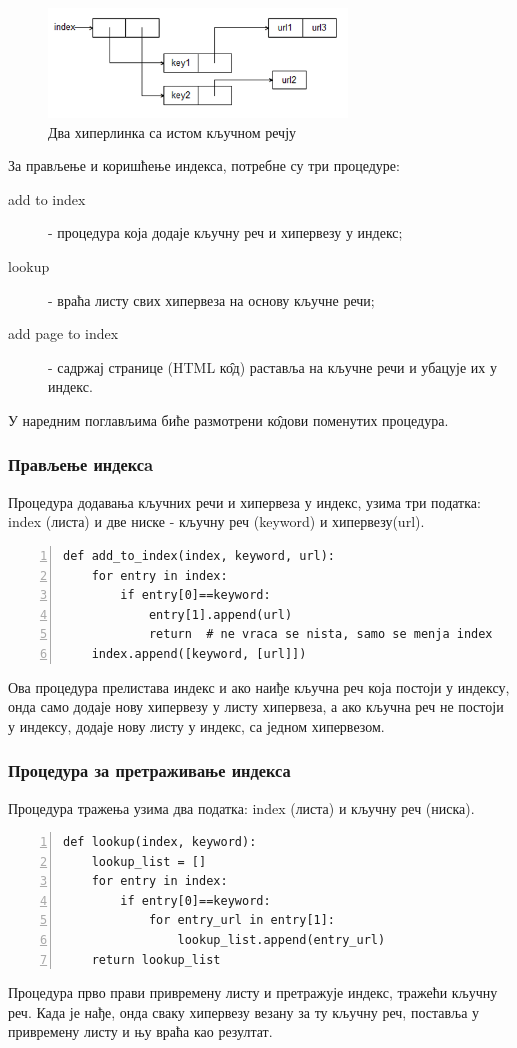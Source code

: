 \documentclass[11pt, serbianc, english, titlepage]{article}
\begin{document}
		\begin{figure}[here]
		\centering
		
		\includegraphics[height=110px, width=300px]{index3.png}
		\caption{Два хиперлинка са истом кључном речју}
		\label{slike:index3}
		\end{figure}	  
	    За прављење и коришћење индекса, потребне су три процедуре:
	    \begin{description}
	    \item[add to index] - процедура која додаје кључну реч и хипервезу у индекс;
	    \item[lookup] - враћа листу свих хипервеза на основу кључне речи;
	    \item[add page to index] - садржај странице (HTML к\^{о}д) раставља на кључне речи и убацује их у индекс.
	    \end{description}
	    У наредним поглављима биће размотрени к\^{о}дови поменутих процедура.
		\subsubsection{Прављење индексa}
		Процедура додавања кључних речи и хипервеза у индекс, узима три податка: index (листа) и две ниске - кључну реч (keyword) и хипервезу(url).
		\begin{lstlisting}[caption=Процедура add\_to\_index, label={lst:addtoindex}, numbers=left]
def add_to_index(index, keyword, url):
    for entry in index:
        if entry[0]==keyword:
            entry[1].append(url)
            return  # ne vraca se nista, samo se menja index
    index.append([keyword, [url]])
		\end{lstlisting}
		Ова процедура прелистава индекс и ако наиђе кључна реч која постоји у индексу, онда само додаје нову хипервезу у листу хипервеза, а ако кључна реч не постоји у индексу, додаје нову листу у индекс, са једном хипервезом.
		\subsubsection{Процедура за претраживање индекса}
		Процедура тражења узима два податка: index (листа) и кључну реч (ниска).
		\begin{lstlisting}[caption=Процедура lookup, label={lst:lookup}, numbers=left]
def lookup(index, keyword):
    lookup_list = []
    for entry in index:
        if entry[0]==keyword:
            for entry_url in entry[1]:
                lookup_list.append(entry_url)
    return lookup_list  
		\end{lstlisting}
		Процедура прво прави привремену листу и претражује индекс, тражећи кључну реч. Када је нађе, онда сваку хипервезу везану за ту кључну реч, поставља у привремену листу и њу враћа као резултат.
		\pagebreak
\end{document}
